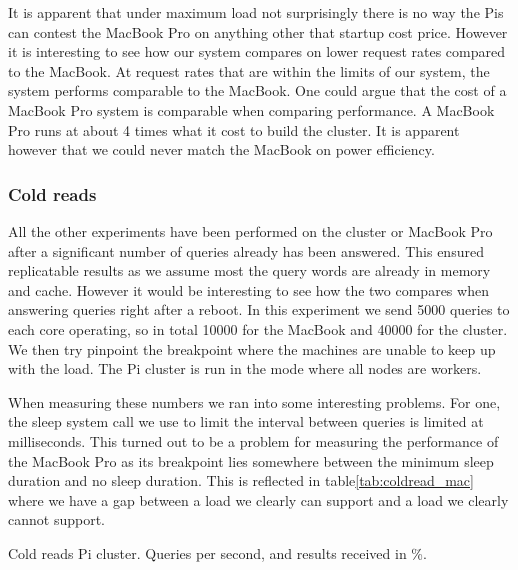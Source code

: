 It is apparent that under maximum load not surprisingly there is no way the Pis can contest the MacBook Pro on anything other that startup cost price.
However it is interesting to see how our system compares on lower request rates compared to the MacBook.
At request rates that are within the limits of our system, the system performs comparable to the MacBook. One could argue that the cost of a MacBook Pro system is comparable when comparing performance. A MacBook Pro runs at about 4 times what it cost to build the cluster. It is apparent however that we could never match the MacBook on power efficiency.

\subsubsection{Cold reads}
\label{sec:coldread}
All the other experiments have been performed on the cluster or MacBook Pro after a significant number of queries already has been answered. This ensured replicatable results as we assume most the query words are already in memory and cache. However it would be interesting to see how the two compares when answering queries right after a reboot. In this experiment we send 5000 queries to each core operating, so in total 10000 for the MacBook and 40000 for the cluster. We then try pinpoint the breakpoint where the machines are unable to keep up with the load. The Pi cluster is run in the mode where all nodes are workers.

When measuring these numbers we ran into some interesting problems. For one, the sleep system call we use to limit the interval between queries is limited at milliseconds. This turned out to be a problem for measuring the performance of the MacBook Pro as its breakpoint lies somewhere between the minimum sleep duration and no sleep duration. This is reflected in table\ref{tab:coldread_mac} where we have a gap between a load we clearly can support and a load we clearly cannot support.

\begin{table}[h]
	\coldreadpi
	\centering
	\pgfplotstabletypeset[
     	columns={orps, oanswers},
     	every head row/.style={after row=\hline},
		every last row/.style={after row=\hline},
		columns/orps/.style={column name=Queries per second},
		columns/oanswers/.style={column name=received(\%)},
     	]
    {\coldreadpi}
    \caption{Cold reads Pi cluster. Queries per second, and results received in \%.}
\label{tab:coldread_pi}
\end{table}

